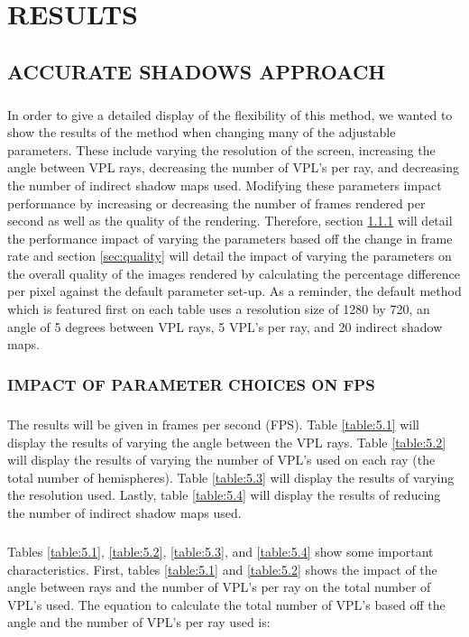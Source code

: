 \chapter{RESULTS}

\section{ACCURATE SHADOWS APPROACH}
\paragraph{}
In order to give a detailed display of the flexibility of this method, we wanted to show the results of the method when changing many of the adjustable parameters.  These include varying the resolution of the screen, increasing the angle between VPL rays, decreasing the number of VPL's per ray, and decreasing the number of indirect shadow maps used. Modifying these parameters impact performance by increasing or decreasing the number of frames rendered per second as well as the quality of the rendering.  Therefore, section \ref{sec:fps} will detail the performance impact of varying the parameters based off the change in frame rate and section \ref{sec:quality} will detail the impact of varying the parameters on the overall quality of the images rendered by calculating the percentage difference per pixel against the default parameter set-up.  As a reminder, the default method which is featured first on each table uses a resolution size of 1280 by 720, an angle of 5 degrees between VPL rays, 5 VPL's per ray, and 20 indirect shadow maps.

\subsection{IMPACT OF PARAMETER CHOICES ON FPS} \label{sec:fps}
\paragraph{}
The results will be given in frames per second (FPS).  Table \ref{table:5.1} will display the results of varying the angle between the VPL rays. Table \ref{table:5.2} will display the results of varying the number of VPL's used on each ray (the total number of hemispheres). Table \ref{table:5.3} will display the results of varying the resolution used.  Lastly, table \ref{table:5.4} will display the results of reducing the number of indirect shadow maps used.

\paragraph{}
Tables \ref{table:5.1}, \ref{table:5.2}, \ref{table:5.3}, and \ref{table:5.4} show some important characteristics.  First, tables \ref{table:5.1} and \ref{table:5.2} shows the impact of the angle between rays and the number of VPL's per ray on the total number of VPL's used.  The equation to calculate the total number of VPL's based off the angle and the number of VPL's per ray used is:

